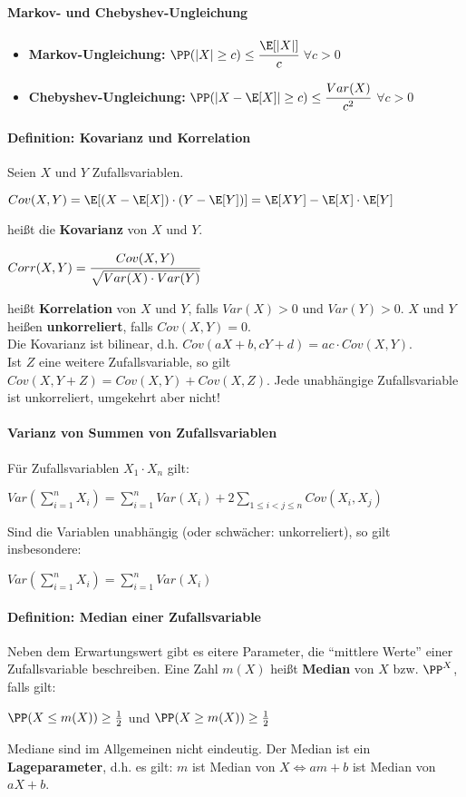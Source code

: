 \paragraph{Markov- und Chebyshev-Ungleichung}
\begin{itemize}
	\item \textbf{Markov-Ungleichung:} $\PP(|X|\geq c)\leq\cfrac{\E[|X|]}{c}$ \qquad$\forall c>0$
	\item \textbf{Chebyshev-Ungleichung:} $\PP(|X-\E[X]|\geq c)\leq\cfrac{Var(X)}{c^2}$ \qquad$\forall c>0$
\end{itemize}

\paragraph{Definition: Kovarianz und Korrelation}
Seien $X$ und $Y$ Zufallsvariablen.
\begin{tightcenter}
	$Cov(X,Y)=\E[(X-\E[X])\cdot(Y-\E[Y])]=\E[XY]-\E[X]\cdot\E[Y]$
\end{tightcenter}
heißt die \textbf{Kovarianz} von $X$ und $Y$.
\begin{tightcenter}
	$Corr(X,Y)=\cfrac{Cov(X,Y)}{\sqrt{Var(X)\cdot Var(Y)}}$
\end{tightcenter}
heißt \textbf{Korrelation} von $X$ und $Y$, falls $Var(X)>0$ und $Var(Y)>0$.
$X$ und $Y$ heißen \textbf{unkorreliert}, falls $Cov(X,Y)=0$.\\
Die Kovarianz ist bilinear, d.h. $Cov(aX+b,cY+d)=ac\cdot Cov(X,Y)$.\\
Ist $Z$ eine weitere Zufallsvariable, so gilt $Cov(X,Y+Z)=Cov(X,Y)+Cov(X,Z)$.
Jede unabhängige Zufallsvariable ist unkorreliert, umgekehrt aber nicht!

\paragraph{Varianz von Summen von Zufallsvariablen}
Für Zufallsvariablen $X_1\cdot X_n$ gilt:
\begin{tightcenter}
	$Var(\sum\limits_{i=1}^{n}X_i)=\sum\limits_{i=1}^{n}Var(X_i)+2\sum\limits_{1\leq i<j\leq n}Cov(X_i,X_j)$
\end{tightcenter}
Sind die Variablen unabhängig (oder schwächer: unkorreliert), so gilt insbesondere:
\begin{tightcenter} 
	$Var(\sum\limits_{i=1}^{n}X_i)=\sum\limits_{i=1}^{n}Var(X_i)$
\end{tightcenter}

\paragraph{Definition: Median einer Zufallsvariable}
Neben dem Erwartungswert gibt es eitere Parameter, die \enquote{mittlere Werte} einer Zufallsvariable beschreiben.
Eine Zahl $m(X)$ heißt \textbf{Median} von $X$ bzw. $\PP^X$, falls gilt:
\begin{tightcenter}
	$\PP(X\leq m(X))\geq\frac{1}{2}$ und $\PP(X\geq m(X))\geq\frac{1}{2}$
\end{tightcenter}
Mediane sind im Allgemeinen nicht eindeutig. 
Der Median ist ein \textbf{Lageparameter}, d.h. es gilt: $m$ ist Median von $X\iff am+b$ ist Median von $aX+b$.


